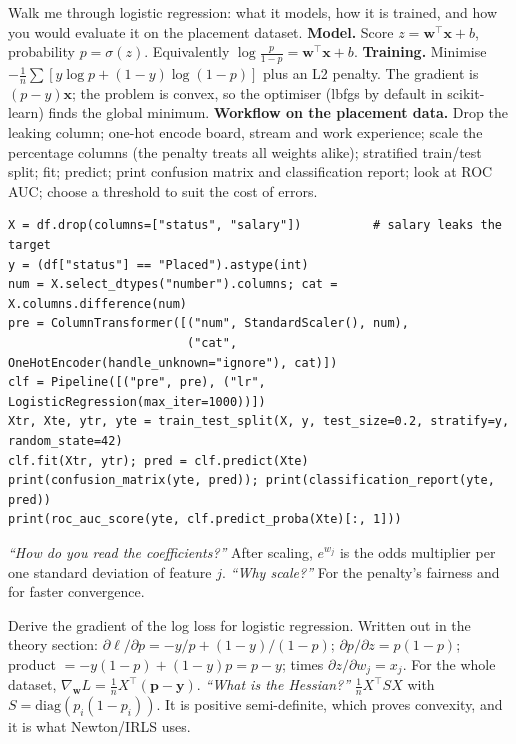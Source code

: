 \begin{qa}{ Walk me through logistic regression: what it models, how it is trained,
and how you would evaluate it on the placement dataset.}
\why
\textbf{Model.} Score $z = \mathbf w^\top\mathbf x + b$, probability $p = \sigma(z)$. Equivalently
$\log\frac{p}{1-p} = \mathbf w^\top\mathbf x + b$.
\textbf{Training.} Minimise $-\frac1n\sum[y\log p + (1-y)\log(1-p)]$ plus an L2 penalty. The gradient is
$(p - y)\mathbf x$; the problem is convex, so the optimiser (lbfgs by default in scikit-learn) finds the global minimum.
\textbf{Workflow on the placement data.} Drop the leaking  column; one-hot encode board, stream and work
experience; scale the percentage columns (the penalty treats all weights alike); stratified train/test split; fit;
predict; print confusion matrix and classification report; look at ROC AUC; choose a threshold to suit the cost of
errors.
\worked
\begin{lstlisting}
X = df.drop(columns=["status", "salary"])          # salary leaks the target
y = (df["status"] == "Placed").astype(int)
num = X.select_dtypes("number").columns; cat = X.columns.difference(num)
pre = ColumnTransformer([("num", StandardScaler(), num),
                         ("cat", OneHotEncoder(handle_unknown="ignore"), cat)])
clf = Pipeline([("pre", pre), ("lr", LogisticRegression(max_iter=1000))])
Xtr, Xte, ytr, yte = train_test_split(X, y, test_size=0.2, stratify=y, random_state=42)
clf.fit(Xtr, ytr); pred = clf.predict(Xte)
print(confusion_matrix(yte, pred)); print(classification_report(yte, pred))
print(roc_auc_score(yte, clf.predict_proba(Xte)[:, 1]))
\end{lstlisting}
\pushes \emph{``How do you read the coefficients?''} After scaling, $e^{w_j}$ is the odds multiplier per one standard
deviation of feature $j$. \emph{``Why scale?''} For the penalty's fairness and for faster convergence.
\end{qa}

\begin{qa}{Derive the gradient of the log loss for logistic regression.}
\why Written out in the theory section: $\partial\ell/\partial p = -y/p + (1-y)/(1-p)$; $\partial p/\partial z =
p(1-p)$; product $= -y(1-p) + (1-y)p = p - y$; times $\partial z/\partial w_j = x_j$. For the whole dataset,
$\nabla_{\mathbf w}L = \frac1n X^\top(\mathbf p - \mathbf y)$.
\pushes \emph{``What is the Hessian?''} $\frac1n X^\top S X$ with $S = \text{diag}(p_i(1-p_i))$. It is positive
semi-definite, which proves convexity, and it is what Newton/IRLS uses.
\end{qa}

